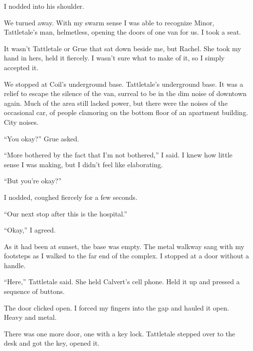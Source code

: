 I nodded into his shoulder.



We turned away.  With my swarm sense I was able to recognize Minor, Tattletale's man, helmetless, opening the doors of one van for us.  I took a seat.



It wasn't Tattletale or Grue that sat down beside me, but Rachel.  She took my hand in hers, held it fiercely.  I wasn't sure what to make of it, so I simply accepted it.



\sectionbreak



We stopped at Coil's underground base.  Tattletale's underground base.  It was a relief to escape the silence of the van, surreal to be in the dim noise of downtown again.  Much of the area still lacked power, but there were the noises of the occasional car, of people clamoring on the bottom floor of an apartment building.  City noises.



``You okay?'' Grue asked.



``More bothered by the fact that I'm not bothered,'' I said.  I knew how little sense I was making, but I didn't feel like elaborating.



``But you're okay?''



I nodded, coughed fiercely for a few seconds.



``Our next stop after this is the hospital.''



``Okay,'' I agreed.



As it had been at sunset, the base was empty.  The metal walkway sang with my footsteps as I walked to the far end of the complex.  I stopped at a door without a handle.



``Here,'' Tattletale said.  She held Calvert's cell phone.  Held it up and pressed a sequence of buttons.



The door clicked open.  I forced my fingers into the gap and hauled it open.  Heavy and metal.



There was one more door, one with a key lock.  Tattletale stepped over to the desk and got the key, opened it.




